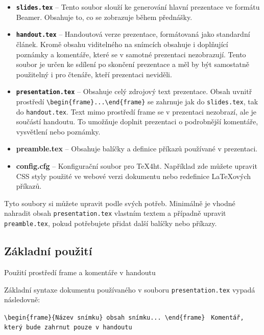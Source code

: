 \begin{itemize}
\item \textbf{\texttt{slides.tex}} – Tento soubor slouží ke generování hlavní prezentace ve formátu Beamer. Obsahuje to, co se zobrazuje během přednášky.

\item \textbf{\texttt{handout.tex}} – Handoutová verze prezentace, formátovaná jako standardní článek. Kromě obsahu viditelného na snímcích obsahuje i doplňující poznámky a komentáře, které se v samotné prezentaci nezobrazují. Tento soubor je určen ke sdílení po skončení prezentace a měl by být samostatně použitelný i pro čtenáře, kteří prezentaci neviděli.

\item \textbf{\texttt{presentation.tex}} – Obsahuje celý zdrojový text prezentace. Obsah uvnitř prostředí \verb|\begin{frame}...\end{frame}| se zahrnuje jak do \texttt{slides.tex}, tak do \texttt{handout.tex}. Text mimo prostředí frame se v prezentaci nezobrazí, ale je součástí handoutu. To umožňuje doplnit prezentaci o podrobnější komentáře, vysvětlení nebo poznámky.

\item \textbf{preamble.tex} – Obsahuje balíčky a definice příkazů používané v prezentaci.

\item \textbf{config.cfg} – Konfigurační soubor pro \TeX4ht. Například zde můžete upravit CSS styly použité ve webové verzi dokumentu nebo redefinice \LaTeX{}ových příkazů.
\end{itemize}

Tyto soubory si můžete upravit podle svých potřeb. Minimálně je vhodné nahradit obsah \texttt{presentation.tex} vlastním textem a případně upravit \texttt{preamble.tex}, pokud potřebujete přidat další balíčky nebo příkazy.

\subsection{Základní použití}


\begin{frame}[fragile]{Použití prostředí frame a komentáře v handoutu}

\begin{block}{}
Základní syntaxe dokumentu používaného v souboru \verb|presentation.tex| vypadá následovně:
\end{block}

\begin{likeverbatim}\verb|\begin{frame}{Název snímku}|\
\verb|obsah snímku...|\
\verb|\end|\verb|{frame}|\
\vspace{1em}
\verb|Komentář, který bude zahrnut pouze v handoutu|
\end{likeverbatim}

\end{frame}

